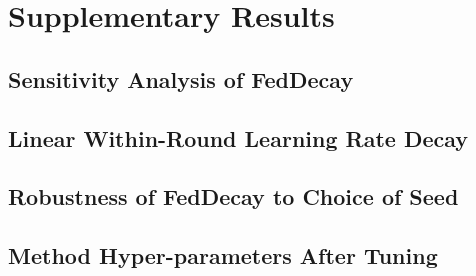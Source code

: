 \documentclass[10pt]{article}
\begin{document}
    \section{Supplementary Results}

        \subsection{Sensitivity Analysis of FedDecay}
        \label{app: decay-app-sens}
        

        \subsection{Linear Within-Round Learning Rate Decay}
        \label{app: decay-app-scheme}
        

        \subsection{Robustness of FedDecay to Choice of Seed}
        \label{app: decay-app-seed}
        

        \subsection{Method Hyper-parameters After Tuning}
        \label{app: decay-app-params}
        
\end{document}
